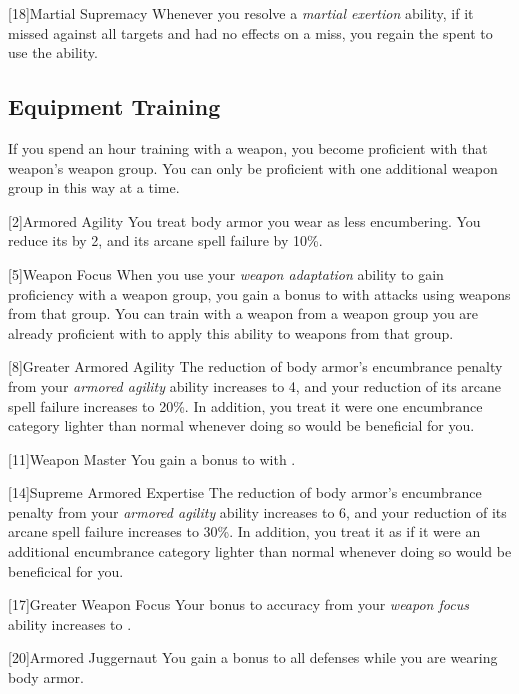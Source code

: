         [18]{Martial Supremacy}
        Whenever you resolve a \textit{martial exertion} ability, if it missed against all targets and had no effects on a miss, you regain the  spent to use the ability.

    \subsection{Equipment Training}
        If you spend an hour training with a weapon, you become proficient with that weapon's weapon group.
        You can only be proficient with one additional weapon group in this way at a time.

        [2]{Armored Agility}
        You treat body armor you wear as less encumbering.
        You reduce its  by 2, and its arcane spell failure by 10\%.

        [5]{Weapon Focus} 
        When you use your \textit{weapon adaptation} ability to gain proficiency with a weapon group, you gain a  bonus to  with attacks using weapons from that group.
        You can train with a weapon from a weapon group you are already proficient with to apply this ability to weapons from that group.

        [8]{Greater Armored Agility}
        The reduction of body armor's encumbrance penalty from your \textit{armored agility} ability increases to 4, and your reduction of its arcane spell failure increases to 20\%.
        In addition, you treat it were one encumbrance category lighter than normal whenever doing so would be beneficial for you.

        [11]{Weapon Master} 
        You gain a  bonus to  with .

        [14]{Supreme Armored Expertise}
        The reduction of body armor's encumbrance penalty from your \textit{armored agility} ability increases to 6, and your reduction of its arcane spell failure increases to 30\%.
        In addition, you treat it as if it were an additional encumbrance category lighter than normal whenever doing so would be beneficical for you.

        [17]{Greater Weapon Focus} 
        Your bonus to accuracy from your \textit{weapon focus} ability increases to .

        [20]{Armored Juggernaut}
        You gain a  bonus to all defenses while you are wearing body armor.


